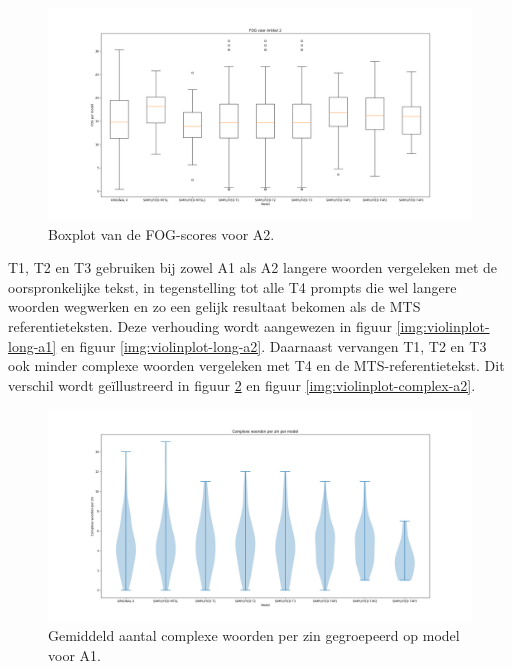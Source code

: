 \begin{figure}
	\includegraphics[width=\linewidth]{img/boxplot-fog-a2.png}
	\caption{Boxplot van de FOG-scores voor A2.}
	\label{img:boxplot-fog-a2}
\end{figure}

T1, T2 en T3 gebruiken bij zowel A1 als A2 langere woorden vergeleken met de oorspronkelijke tekst, in tegenstelling tot alle T4 prompts die wel langere woorden wegwerken en zo een gelijk resultaat bekomen als de MTS referentieteksten. Deze verhouding wordt aangewezen in figuur \ref{img:violinplot-long-a1} en figuur \ref{img:violinplot-long-a2}. Daarnaast vervangen T1, T2 en T3 ook minder complexe woorden vergeleken met T4 en de MTS-referentietekst. Dit verschil wordt geïllustreerd in figuur \ref{img:violinplot-complex-a1} en figuur \ref{img:violinplot-complex-a2}.

\begin{figure}
	\includegraphics[width=\linewidth]{img/violinplot-complex-a1.png}
	\caption{Gemiddeld aantal complexe woorden per zin gegroepeerd op model voor A1.}
	\label{img:violinplot-complex-a1}
\end{figure}

